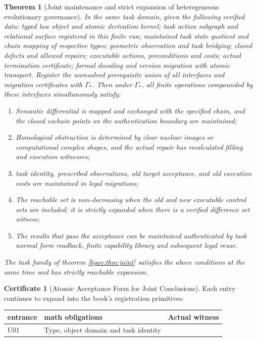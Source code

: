 \documentclass[12pt,a4paper,openany,notitlepage]{report}
\theoremstyle{plain}
\newtheorem{theorem}{Theorem}[chapter]
\theoremstyle{definition}
\newtheorem*{certificate}{Certificate}
\theoremstyle{remark}
\begin{document}
\begin{CJK*}
\begin{theorem}
[Joint maintenance and strict expansion of heterogeneous evolutionary governance]\label{hgov:thm:main}
In the same task domain, given the following verified data: typed law object and atomic derivation kernel; task action subgraph and relational surface registered in this finite run; maintained task state quotient and chain mapping of respective types; geometric observation and task bridging; closed defects and allowed repairs; executable actions, preconditions and costs; actual termination certificate; formal decoding and version migration with atomic transport. Register the unresolved prerequisite union of all interfaces and migration certificates with $\Gamma_*$. Then under $\Gamma_*$, all finite operations compounded by these interfaces simultaneously satisfy:\begin{enumerate}
[label=(\roman*)]\item
Semantic differential is mapped and exchanged with the specified chain, and the closed cochain points on the authentication boundary are maintained;\item
Homological obstruction is determined by clear nuclear images or computational complex shapes, and the actual repair has recalculated filling and execution witnesses;\item
task identity, prescribed observations, old target acceptance, and old execution costs are maintained in legal migrations;\item
The reachable set is non-decreasing when the old and new executable control sets are included; it is strictly expanded when there is a verified difference set witness;\item
The results that pass the acceptance can be maintained authenticated by task normal form readback, finite capability library and subsequent legal reuse.\end{enumerate}
The task family of theorem \ref{hgov:thm:joint} satisfies the above conditions at the same time and has strictly reachable expansion.\end{theorem}
\begin{certificate}
[Atomic Acceptance Form for Joint Conclusions]Each entry continues to expand into the book's registration primitives:\begin{center}
\small\begin{tabularx}
{\textwidth}{P{.10\textwidth}YY}\toprule
entrance&
math obligations&
Actual witness\\
\midrule
U01&
Type, object domain and task identity&

\end{tabularx}
\end{center}
\end{certificate}
\end{CJK*}
\end{document}
